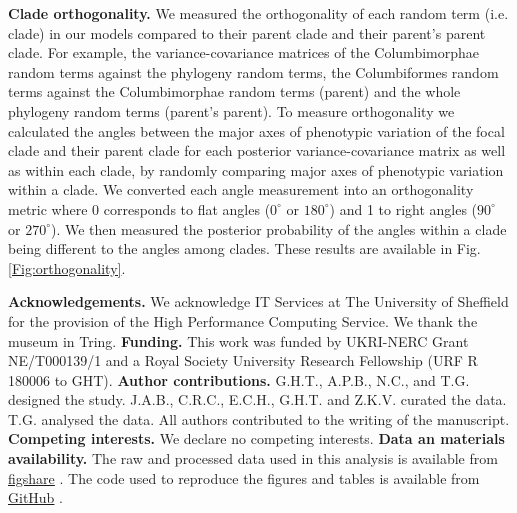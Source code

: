 \documentclass[12pt,letterpaper]{article}
\begin{document}
\textbf{Clade orthogonality.}
We measured the orthogonality of each random term (i.e. clade) in our models compared to their parent clade and their parent's parent clade.
For example, the variance-covariance matrices of the Columbimorphae random terms against the phylogeny random terms, the Columbiformes random terms against the Columbimorphae random terms (parent) and the whole phylogeny random terms (parent's parent).
To measure orthogonality we calculated the angles between the major axes of phenotypic variation of the focal clade and their parent clade for each posterior variance-covariance matrix as well as within each clade, by randomly comparing major axes of phenotypic variation within a clade.
We converted each angle measurement into an orthogonality metric where 0 corresponds to flat angles ($0^\circ$ or  $180^\circ$) and 1 to right angles ($90^\circ$ or $270^\circ$).
We then measured the posterior probability of the angles within a clade being different to the angles among clades.
These results are available in Fig. \ref{Fig:orthogonality}.







\textbf{Acknowledgements.}
We acknowledge IT Services at The University of Sheffield for the provision of the High Performance Computing Service.
We thank the museum in Tring.
\textbf{Funding.}
This work was funded by UKRI-NERC Grant NE/T000139/1 and a Royal Society University Research Fellowship (URF R 180006 to GHT).
\textbf{Author contributions.}
G.H.T., A.P.B., N.C., and T.G. designed the study. J.A.B., C.R.C., E.C.H., G.H.T. and Z.K.V. curated the data. T.G. analysed the data. All authors contributed to the writing of the manuscript.
\textbf{Competing interests.}
We declare no competing interests.
\textbf{Data an materials availability.}
The raw and processed data used in this analysis is available from \href{https://figshare.shef.ac.uk/account/articles/21526146}{figshare} \cite{fighsaredata}.
The code used to reproduce the figures and tables is available from \href{https://github.com/TGuillerme/elaboration_exploration_bird_beaks}{GitHub} \cite{githubrepo}.

\end{document}
